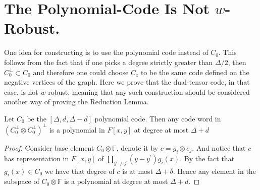\section{The Polynomial-Code Is Not $w$-Robust.}
One idea for constructing is to use the polynomial code instead of $C_{0}$. This follows from the fact that if one picks a degree strictly greater than $\Delta/2$, then $C_{0}^{\perp} \subset C_{0}$ and therefore one could choose $C_{z}$ to be the same code defined on the negative vertices of the graph.  Here we prove that the dual-tensor code, in that case, is not $w$-robust, meaning that any such construction should be considered another way of proving the Reduction Lemma.



\begin{claim}
  \label{claim:poldu}
  Let $C_{0}$ be the $[\Delta,d, \Delta-d]$ polynomial code. Then any code word in $\left( C_{0}^{\perp} \otimes C_{0}^{\perp} \right)^{\perp}$ is a polynomial in $F[x,y]$ at degree at most $\Delta + d$
\end{claim}
\begin{proof}
Consider base element $ C_{0} \otimes \mathbb{F} $, denote it by $c = g_{i} \otimes e_{j}$. And notice that $c$ has representation in $F[x,y]$ of $\prod_{y^{\prime} \neq j}{\left( y - y^{\prime} \right) }g_{i}\left( x \right)$. By the fact that $g_{i}\left( x \right) \in C_{0} $ we have that degree of $c$ is at most $\Delta + \delta$. Hence any element in the subspace of $C_{0} \otimes \mathbb{F}$ is a polynomial at degree at most $\Delta + d$.   
\end{proof}

